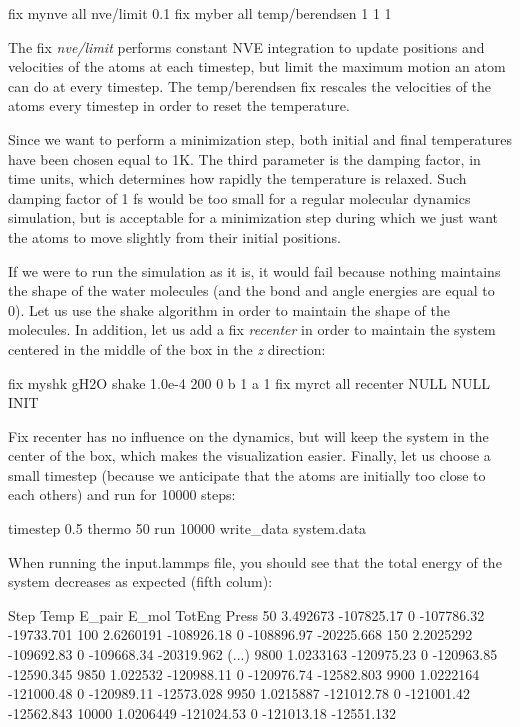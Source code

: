\begin{lcverbatim}
fix mynve all nve/limit 0.1
fix myber all temp/berendsen 1 1 1
\end{lcverbatim}

\noindent The fix \textit{nve/limit} performs constant NVE integration to
update positions and velocities of the atoms at each
timestep, but limit the maximum motion an atom can do at
every timestep. The temp/berendsen fix rescales the
velocities of the atoms every timestep in order to reset the
temperature.

Since we want to perform a minimization step, both initial
and final temperatures have been chosen equal to 1K. The
third parameter is the damping factor, in time units, which
determines how rapidly the temperature is relaxed. Such
damping factor of 1 fs would be too small for a regular
molecular dynamics simulation, but is acceptable for a
minimization step during which we just want the atoms to
move slightly from their initial positions.

If we were to run the simulation as it is, it would fail
because nothing maintains the shape of the water molecules
(and the bond and angle energies are equal to 0). Let us use
the shake algorithm in order to maintain the shape of the
molecules. In addition, let us add a fix \textit{recenter} in order
to maintain the system centered in the middle of the box in
the \textit{z} direction:

\begin{lcverbatim}
fix myshk gH2O shake 1.0e-4 200 0 b 1 a 1
fix myrct all recenter NULL NULL INIT
\end{lcverbatim}

\noindent Fix recenter has no influence on the dynamics, but will keep the system in the 
center of the box, which makes the visualization easier.
Finally, let us choose a small timestep (because we
anticipate that the atoms are initially too close to each
others) and run for 10000 steps:

\begin{lcverbatim}
timestep 0.5
thermo 50
run 10000
write_data system.data
\end{lcverbatim}

\noindent When running the input.lammps file, you should see that the
total energy of the system decreases as expected (fifth
colum):

\begin{lcverbatim}
Step   Temp          E_pair         E_mol          TotEng         Press     
50   3.492673      -107825.17      0             -107786.32     -19733.701    
100   2.6260191     -108926.18      0             -108896.97     -20225.668    
150   2.2025292     -109692.83      0             -109668.34     -20319.962 
(...)
9800   1.0233163     -120975.23      0             -120963.85     -12590.345    
9850   1.022532      -120988.11      0             -120976.74     -12582.803    
9900   1.0222164     -121000.48      0             -120989.11     -12573.028    
9950   1.0215887     -121012.78      0             -121001.42     -12562.843    
10000   1.0206449     -121024.53      0             -121013.18     -12551.132 
\end{lcverbatim}

